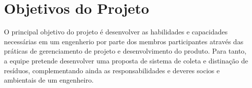 \section{Objetivos do Projeto}

  O principal objetivo do projeto é desenvolver as habilidades e
  capacidades necessárias em um engenherio por parte dos membros
  participantes através das práticas de gerenciamento de projeto
  e desenvolvimento do produto. Para tanto, a equipe pretende
  desenvolver uma proposta de sistema de coleta e distinação de resíduos,
  complementando ainda as responsabilidades e deveres socios e ambientais
  de um engenheiro.
